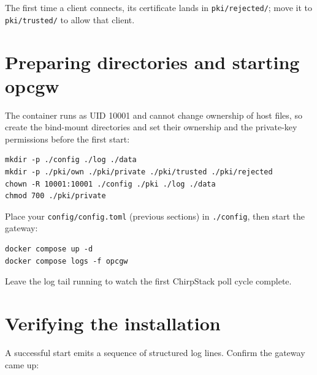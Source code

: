 The first time a client connects, its certificate lands in \texttt{pki/rejected/}; move it to \texttt{pki/trusted/} to allow that client.

\section{Preparing directories and starting opcgw}\label{sec-install-start}

The container runs as UID 10001 and cannot change ownership of host files, so create the bind-mount directories and set their ownership and the private-key permissions before the first start:

\begin{lstlisting}
mkdir -p ./config ./log ./data
mkdir -p ./pki/own ./pki/private ./pki/trusted ./pki/rejected
chown -R 10001:10001 ./config ./pki ./log ./data
chmod 700 ./pki/private
\end{lstlisting}

Place your \texttt{config/config.toml} (previous sections) in \texttt{./config}, then start the gateway:

\begin{lstlisting}
docker compose up -d
docker compose logs -f opcgw
\end{lstlisting}

Leave the log tail running to watch the first ChirpStack poll cycle complete.

\section{Verifying the installation}\label{sec-install-verify}

A successful start emits a sequence of structured log lines. Confirm the gateway came up:

